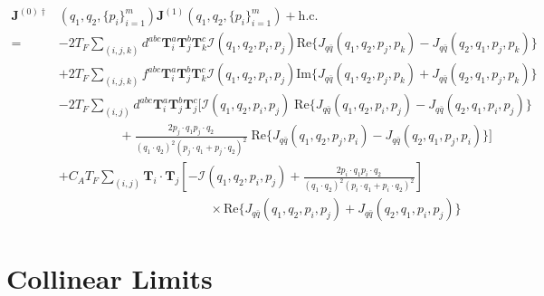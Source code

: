 \documentclass[a4paper,11pt]{article}
\begin{document}
\begin{equation}
\begin{split}
\mathbf{J}^{(0)\dagger}&(q_1, q_2,\{ p_i \}_{i=1}^m ) \mathbf{J}^{(1)}(q_1, q_2, \{ p_i \}_{i=1}^m ) + \text{h.c.} \\
 = &-2T_F \sum_{(i,j,k)} d^{abc} \mathbf{T}_i^a \mathbf{T}_j^b \mathbf{T}_k^c \mathcal{I}(q_1, q_2, p_i, p_j) \text{Re} \big \lbrace J_{q\bar{q}} (q_1, q_2, p_j, p_k) - J_{q \bar{q}}(q_2, q_1, p_j, p_k)  \big \rbrace  \\
&  +2T_F \sum_{(i,j,k)} f^{abc} \mathbf{T}_i^a \mathbf{T}_j^b \mathbf{T}_k^c \mathcal{I}(q_1, q_2, p_i, p_j) \text{Im} \big \lbrace J_{q\bar{q}} (q_1, q_2, p_j, p_k) + J_{q \bar{q}}(q_2, q_1, p_j, p_k)  \big \rbrace  \\
& - 2T_F \sum_{(i,j)} d^{abc} \mathbf{T}_i^a \mathbf{T}_j^b \mathbf{T}_j^c \bigg [ \mathcal{I}(q_1, q_2, p_i, p_j) \; \text{Re} \bigg \lbrace J_{q \bar{q}} (q_1, q_2, p_i, p_j) - J_{q \bar{q}} (q_2, q_1, p_i, p_j) \bigg \rbrace  \\
& \hspace{2cm}  + \frac{2 p_j \cdot q_1 p_j \cdot q_2}{(q_1 \cdot q_2)^2 (p_j \cdot q_1 + p_j \cdot q_2)^2}  \; \text{Re} \bigg \lbrace J_{q \bar{q}} (q_1, q_2, p_j, p_i) - J_{q \bar{q}} (q_2, q_1, p_j, p_i) \bigg \rbrace \bigg ] \\
& + C_A T_F \sum_{(i,j)} \mathbf{T}_i \cdot \mathbf{T}_j \left[- \mathcal{I}(q_1, q_2, p_i, p_j) + \frac{2 p_i \cdot q_1 p_i \cdot q_2}{(q_1 \cdot q_2)^2 (p_i \cdot q_1 + p_i \cdot q_2)^2} \right] \\
&\hspace{5cm} \times \text{Re} \bigg \lbrace J_{q \bar{q}}(q_1, q_2, p_i, p_j) + J_{q \bar{q}} (q_2, q_1, p_i, p_j) \bigg \rbrace
\end{split}
\end{equation}

\section{Collinear Limits}
\end{document}
